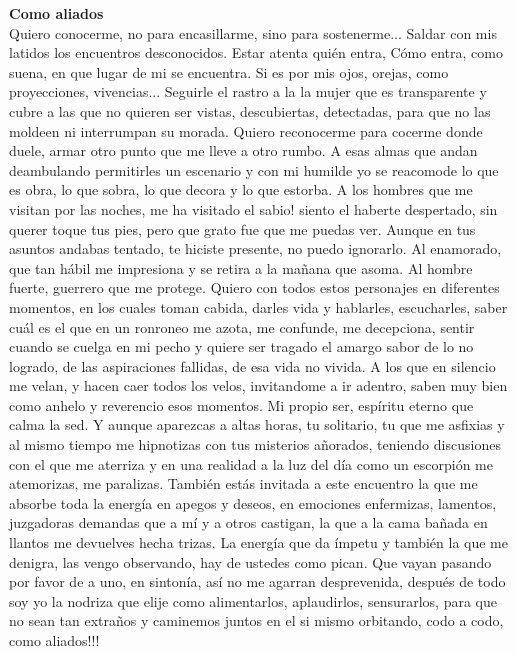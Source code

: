 \documentclass[12pt, a4paper, twoside]{book} %
\begin{document}
\noindent\textbf{Como aliados}\\
Quiero conocerme, no para encasillarme, sino para sostenerme...
Saldar con mis latidos los encuentros desconocidos.
Estar atenta quién entra, Cómo entra, como suena, en que lugar de mi se encuentra.
Si es por mis ojos, orejas, como proyecciones, vivencias...
Seguirle el rastro a la la mujer que es transparente y cubre a las que no quieren ser vistas, descubiertas, detectadas, para que no las moldeen ni interrumpan su morada.
Quiero reconocerme para cocerme donde duele, armar otro punto que me lleve a otro rumbo.
A esas almas que andan deambulando permitirles un escenario y con mi humilde yo se reacomode lo que es obra, lo que sobra, lo que decora y lo que estorba.
A los hombres que me visitan por las noches, me ha visitado el sabio! siento el haberte despertado, sin querer toque tus pies, pero que grato fue que me puedas ver.
Aunque en tus asuntos andabas tentado, te hiciste presente, no puedo ignorarlo.
Al enamorado, que tan hábil me impresiona y se retira a la mañana que asoma.
Al hombre fuerte, guerrero que me protege.
Quiero con todos estos personajes en diferentes momentos, en los cuales  toman cabida, darles vida y hablarles, escucharles, saber cuál es el que en un ronroneo me azota, me confunde, me decepciona, sentir cuando se cuelga en mi pecho y quiere ser tragado el amargo sabor de lo no logrado, de las aspiraciones fallidas, de esa vida no vivida.
A los que en silencio me velan, y  hacen caer todos los velos, invitandome a ir adentro, saben muy bien como anhelo y reverencio esos momentos. Mi propio ser, espíritu eterno que calma la sed.
Y aunque aparezcas a altas horas, tu solitario, tu que me asfixias y al mismo tiempo me hipnotizas con tus misterios añorados, teniendo discusiones con el que me aterriza y en una realidad  a la luz del día como un escorpión me atemorizas, me paralizas.
También estás invitada a este encuentro la que me absorbe toda la energía en apegos y deseos, en emociones enfermizas, lamentos, juzgadoras demandas que a mí y a otros castigan, la que a la cama bañada en llantos me devuelves hecha trizas.
La energía que da ímpetu y también la que me denigra, las vengo observando, hay de ustedes como pican.
Que vayan pasando por favor de a uno, en sintonía, así no me agarran desprevenida, después de todo soy yo la nodriza que elije como alimentarlos, aplaudirlos, sensurarlos, para que no sean tan extraños y caminemos juntos en el si mismo orbitando, codo a codo, como aliados!!!
\end{document}
